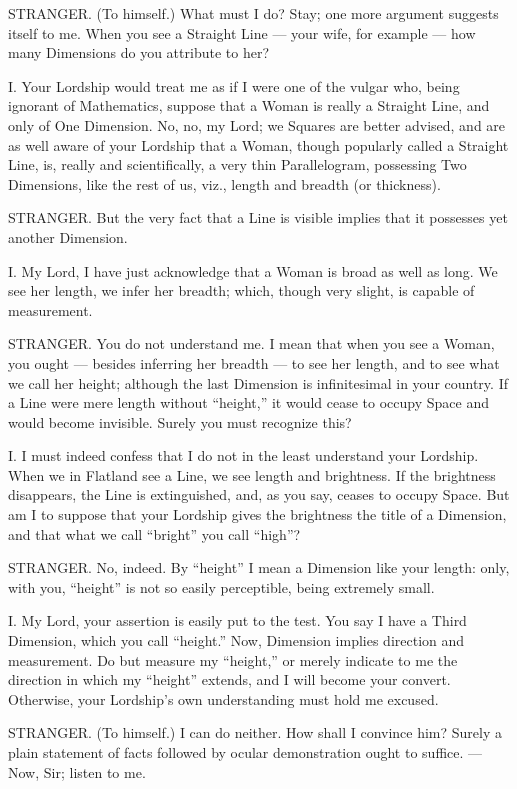 \documentclass[12pt, a4paper, oneside]{memoir}
\begin{document}
STRANGER. (To himself.) What must I do? Stay; one more argument suggests
itself to me. When you see a Straight Line --- your wife, for example --- how many
Dimensions do you attribute to her?

I. Your Lordship would treat me as if I were one of the vulgar who, being
ignorant of Mathematics, suppose that a Woman is really a Straight Line, and
only of One Dimension. No, no, my Lord; we Squares are better advised, and are
as well aware of your Lordship that a Woman, though popularly called a
Straight Line, is, really and scientifically, a very thin Parallelogram,
possessing Two Dimensions, like the rest of us, viz., length and breadth (or
thickness).

STRANGER. But the very fact that a Line is visible implies that it possesses
yet another Dimension.

I. My Lord, I have just acknowledge that a Woman is broad as well as long. We
see her length, we infer her breadth; which, though very slight, is capable of
measurement.

STRANGER. You do not understand me. I mean that when you see a Woman, you
ought --- besides inferring her breadth --- to see her length, and to see what we
call her height; although the last Dimension is infinitesimal in your country.
If a Line were mere length without ``height,'' it would cease to occupy Space
and would become invisible. Surely you must recognize this?

I. I must indeed confess that I do not in the least understand your Lordship.
When we in Flatland see a Line, we see length and brightness. If the
brightness disappears, the Line is extinguished, and, as you say, ceases to
occupy Space. But am I to suppose that your Lordship gives the brightness the
title of a Dimension, and that what we call ``bright'' you call ``high''?

STRANGER. No, indeed. By ``height'' I mean a Dimension like your length: only,
with you, ``height'' is not so easily perceptible, being extremely small.

I. My Lord, your assertion is easily put to the test. You say I have a Third
Dimension, which you call ``height.'' Now, Dimension implies direction and
measurement. Do but measure my ``height,'' or merely indicate to me the
direction in which my ``height'' extends, and I will become your convert.
Otherwise, your Lordship's own understanding must hold me excused.

STRANGER. (To himself.) I can do neither. How shall I convince him? Surely a
plain statement of facts followed by ocular demonstration ought to suffice. ---
Now, Sir; listen to me.
\end{document}
